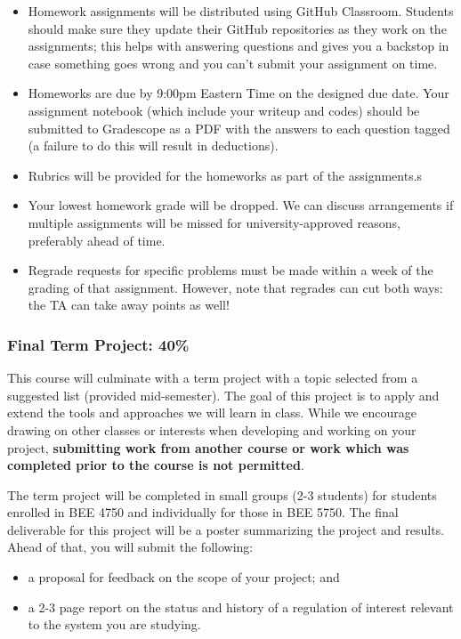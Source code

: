 \documentclass[
  letterpaper,
  DIV=11,
  numbers=noendperiod]{scrartcl}
\providecommand{\tightlist}{%
  \setlength{\itemsep}{0pt}\setlength{\parskip}{0pt}}\usepackage{longtable,booktabs,array}
\begin{document}
\begin{itemize}
\tightlist
\item
  Homework assignments will be distributed using GitHub Classroom.
  Students should make sure they update their GitHub repositories as
  they work on the assignments; this helps with answering questions and
  gives you a backstop in case something goes wrong and you can't submit
  your assignment on time.
\item
  Homeworks are due by 9:00pm Eastern Time on the designed due date.
  Your assignment notebook (which include your writeup and codes) should
  be submitted to Gradescope as a PDF with the answers to each question
  tagged (a failure to do this will result in deductions).
\item
  Rubrics will be provided for the homeworks as part of the
  assignments.s
\item
  Your lowest homework grade will be dropped. We can discuss
  arrangements if multiple assignments will be missed for
  university-approved reasons, preferably ahead of time.
\item
  Regrade requests for specific problems must be made within a week of
  the grading of that assignment. However, note that regrades can cut
  both ways: the TA can take away points as well!
\end{itemize}

\hypertarget{final-term-project-40}{%
\subsubsection{Final Term Project: 40\%}\label{final-term-project-40}}

This course will culminate with a term project with a topic selected
from a suggested list (provided mid-semester). The goal of this project
is to apply and extend the tools and approaches we will learn in class.
While we encourage drawing on other classes or interests when developing
and working on your project, \textbf{submitting work from another course
or work which was completed prior to the course is not permitted}.

The term project will be completed in small groups (2-3 students) for
students enrolled in BEE 4750 and individually for those in BEE 5750.
The final deliverable for this project will be a poster summarizing the
project and results. Ahead of that, you will submit the following:

\begin{itemize}
\tightlist
\item
  a proposal for feedback on the scope of your project; and
\item
  a 2-3 page report on the status and history of a regulation of
  interest relevant to the system you are studying.
\end{itemize}
\end{document}
